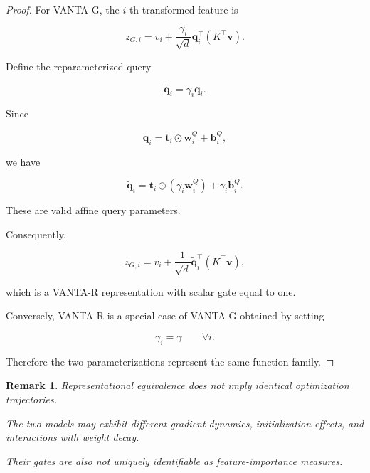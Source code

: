 \documentclass[11pt,a4paper]{article}
\newtheorem{remark}{Remark}
\newcommand{\od}{\odot}
\begin{document}
\begin{proof}

For VANTA-G, the $i$-th transformed
feature is

\begin{equation}
z_{G,i}
=
v_i+
\frac{\gamma_i}{\sqrt d}
\mathbf{q}_i^\top
(K^\top\mathbf{v}).
\end{equation}

Define the reparameterized query

\begin{equation}
\tilde{\mathbf{q}}_i
=
\gamma_i\mathbf{q}_i.
\end{equation}

Since

\begin{equation}
\mathbf{q}_i
=
\mathbf{t}_i\od\mathbf{w}_i^Q
+\mathbf{b}_i^Q,
\end{equation}

we have

\begin{equation}
\tilde{\mathbf{q}}_i
=
\mathbf{t}_i\od
(\gamma_i\mathbf{w}_i^Q)
+
\gamma_i\mathbf{b}_i^Q.
\end{equation}

These are valid affine query parameters.

Consequently,

\begin{equation}
z_{G,i}
=
v_i+
\frac{1}{\sqrt d}
\tilde{\mathbf{q}}_i^\top
(K^\top\mathbf{v}),
\end{equation}

which is a VANTA-R representation
with scalar gate equal to one.

Conversely, VANTA-R is a special case
of VANTA-G obtained by setting

\begin{equation}
\gamma_i=\gamma
\qquad\forall i.
\end{equation}

Therefore the two parameterizations
represent the same function family.
\end{proof}

\begin{remark}
Representational equivalence does not
imply identical optimization trajectories.

The two models may exhibit different
gradient dynamics, initialization effects,
and interactions with weight decay.

Their gates are also not uniquely
identifiable as feature-importance measures.
\end{remark}
\end{document}
